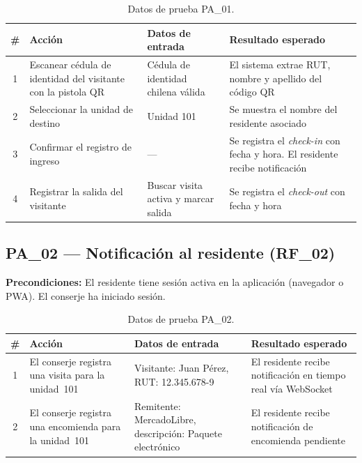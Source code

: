 \begin{table}[H]
\centering
\small
\begin{tabular}{|c|p{}|p{}|p{}|}
\hline
\textbf{\#} & \textbf{Acción} & \textbf{Datos de entrada} & \textbf{Resultado esperado} \\ \hline
1 & Escanear cédula de identidad del visitante con la pistola QR & Cédula de identidad chilena válida & El sistema extrae RUT, nombre y apellido del código QR \\ \hline
2 & Seleccionar la unidad de destino & Unidad 101 & Se muestra el nombre del residente asociado \\ \hline
3 & Confirmar el registro de ingreso & --- & Se registra el \textit{check-in} con fecha y hora. El residente recibe notificación \\ \hline
4 & Registrar la salida del visitante & Buscar visita activa y marcar salida & Se registra el \textit{check-out} con fecha y hora \\ \hline
\end{tabular}
\caption{Datos de prueba PA\_01.}
\end{table}

\subsection{PA\_02 — Notificación al residente (RF\_02)}

\textbf{Precondiciones:} El residente tiene sesión activa en la aplicación (navegador o PWA). El conserje ha iniciado sesión.

\begin{table}[H]
\centering
\small
\begin{tabular}{|c|p{}|p{}|p{}|}
\hline
\textbf{\#} & \textbf{Acción} & \textbf{Datos de entrada} & \textbf{Resultado esperado} \\ \hline
1 & El conserje registra una visita para la unidad~101 & Visitante: Juan Pérez, RUT: 12.345.678-9 & El residente recibe notificación en tiempo real vía WebSocket \\ \hline
2 & El conserje registra una encomienda para la unidad~101 & Remitente: MercadoLibre, descripción: Paquete electrónico & El residente recibe notificación de encomienda pendiente \\ \hline
\end{tabular}
\caption{Datos de prueba PA\_02.}
\end{table}

